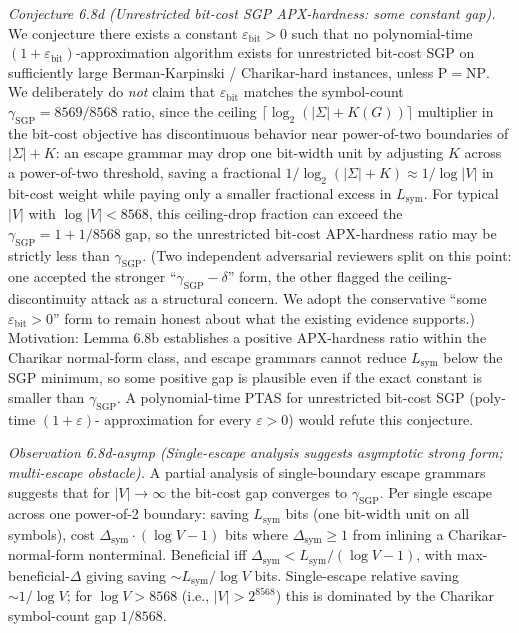 \documentclass[
]{article}
\begin{document}
\begin{itemize}
  \emph{Conjecture 6.8d (Unrestricted bit-cost SGP APX-hardness:
  some constant gap).} We conjecture there exists a constant
  $\varepsilon_{\mathrm{bit}} > 0$ such that no polynomial-time
  $(1 + \varepsilon_{\mathrm{bit}})$-approximation algorithm exists
  for unrestricted bit-cost SGP on sufficiently large
  Berman-Karpinski / Charikar-hard instances, unless
  $\mathrm{P} = \mathrm{NP}$. We deliberately do \emph{not} claim
  that $\varepsilon_{\mathrm{bit}}$ matches the symbol-count
  $\gamma_{\mathrm{SGP}} = 8569/8568$ ratio, since the ceiling
  $\lceil \log_2(|\Sigma| + K(G)) \rceil$ multiplier in the
  bit-cost objective has discontinuous behavior near
  power-of-two boundaries of $|\Sigma| + K$: an escape grammar
  may drop one bit-width unit by adjusting $K$ across a power-of-two
  threshold, saving a fractional $1/\log_2(|\Sigma|+K) \approx
  1/\log |V|$ in bit-cost weight while paying only a smaller
  fractional excess in $L_{\mathrm{sym}}$. For typical
  $|V|$ with $\log |V| < 8568$, this ceiling-drop fraction can
  exceed the $\gamma_{\mathrm{SGP}} = 1 + 1/8568$ gap, so the
  unrestricted bit-cost APX-hardness ratio may be strictly less
  than $\gamma_{\mathrm{SGP}}$. (Two independent
  adversarial reviewers split on this point: one accepted the
  stronger ``$\gamma_{\mathrm{SGP}} - \delta$'' form, the other
  flagged the ceiling-discontinuity attack as a structural concern.
  We adopt the conservative ``some $\varepsilon_{\mathrm{bit}} > 0$''
  form to remain honest about what the existing evidence
  supports.) Motivation: Lemma 6.8b establishes a positive
  APX-hardness ratio within the Charikar normal-form class, and
  escape grammars cannot reduce $L_{\mathrm{sym}}$ below the SGP
  minimum, so some positive gap is plausible even if the exact
  constant is smaller than $\gamma_{\mathrm{SGP}}$. A polynomial-time
  PTAS for unrestricted bit-cost SGP (poly-time $(1 + \varepsilon)$-
  approximation for every $\varepsilon > 0$) would refute this
  conjecture.

  \emph{Observation 6.8d-asymp (Single-escape analysis suggests
  asymptotic strong form; multi-escape obstacle).} A partial analysis
  of single-boundary escape grammars suggests that for $|V| \to \infty$
  the bit-cost gap converges to $\gamma_{\mathrm{SGP}}$. Per single
  escape across one power-of-2 boundary: saving $L_{\mathrm{sym}}$
  bits (one bit-width unit on all symbols), cost
  $\Delta_{\mathrm{sym}} \cdot (\log V - 1)$ bits where
  $\Delta_{\mathrm{sym}} \geq 1$ from inlining a Charikar-normal-form
  nonterminal. Beneficial iff $\Delta_{\mathrm{sym}} < L_{\mathrm{sym}}/(\log V - 1)$,
  with max-beneficial-$\Delta$ giving saving $\sim L_{\mathrm{sym}}/\log V$ bits.
  Single-escape relative saving $\sim 1/\log V$; for $\log V > 8568$
  (i.e., $|V| > 2^{8568}$) this is dominated by the Charikar
  symbol-count gap $1/8568$.


\end{itemize}
\end{document}
